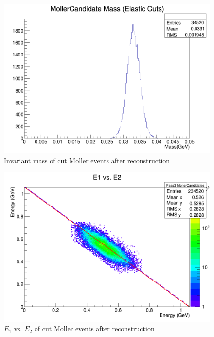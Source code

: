 \documentclass{article}
\begin{document}
	\begin{figure}[H]
  	\includegraphics[width=\linewidth]{PostCollabMeet/Pass3PureMoller/CUT_InvarMass.png}
  	\caption{Invariant mass of cut Moller events after reconstruction}
  	\label{fig:cutMass}
	\end{figure}
	
	
	\begin{figure}[H]
  	\includegraphics[width=\linewidth]{PostCollabMeet/Pass3PureMoller/CUT_PlotEE.png}
  	\caption{$E_1$ vs. $E_2$ of cut Moller events after reconstruction}
  	\label{fig:cutEE}
	\end{figure}
	
\end{document}

